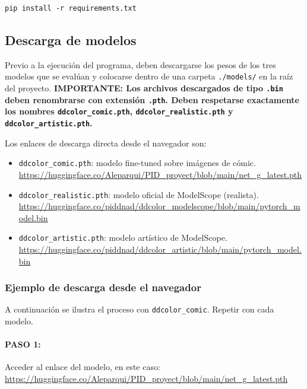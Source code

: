 \documentclass[a4paper]{article}
\begin{document}
\begin{verbatim}
pip install -r requirements.txt
\end{verbatim}

\subsection{Descarga de modelos}

Previo a la ejecución del programa, deben descargarse los pesos de los tres modelos que se evalúan y colocarse dentro de una carpeta \texttt{./models/} en la raíz del proyecto. \textbf{IMPORTANTE: Los archivos descargados de tipo \texttt{.bin} deben renombrarse con extensión \texttt{.pth}. Deben respetarse exactamente los nombres \texttt{ddcolor\_comic.pth}, \texttt{ddcolor\_realistic.pth} y \texttt{ddcolor\_artistic.pth}.}

Los enlaces de descarga directa desde el navegador son:

\begin{itemize}
  \item \texttt{ddcolor\_comic.pth}: modelo fine-tuned sobre imágenes de cómic.\\
  \url{https://huggingface.co/Aleparqui/PID_proyect/blob/main/net_g_latest.pth}

  \item \texttt{ddcolor\_realistic.pth}: modelo oficial de ModelScope (realista).\\
  \url{https://huggingface.co/piddnad/ddcolor_modelscope/blob/main/pytorch_model.bin}

  \item \texttt{ddcolor\_artistic.pth}: modelo artístico de ModelScope.\\
  \url{https://huggingface.co/piddnad/ddcolor_artistic/blob/main/pytorch_model.bin}
\end{itemize}

\subsubsection{Ejemplo de descarga desde el navegador}

A continuación se ilustra el proceso con \texttt{ddcolor\_comic}. Repetir con cada modelo.

\paragraph{PASO 1:} Acceder al enlace del modelo, en este caso:\\
\url{https://huggingface.co/Aleparqui/PID_proyect/blob/main/net_g_latest.pth}
\end{document}

